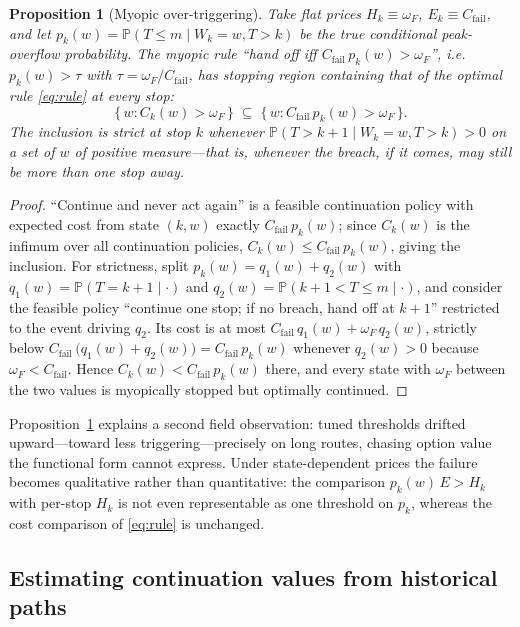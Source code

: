 \documentclass[preprint,authoryear,12pt]{elsarticle}
\newtheorem{proposition}[theorem]{Proposition}
\theoremstyle{definition}
\theoremstyle{remark}
\begin{document}
\begin{proposition}[Myopic over-triggering]\label{prop:myopic}
Take flat prices $H_k \equiv \omega_F$, $E_k \equiv C_{\mathrm{fail}}$,
and let $p_k(w) = \mathbb P(T \le m \mid W_k = w, T > k)$ be the true
conditional peak-overflow probability. The myopic rule ``hand off iff
$C_{\mathrm{fail}}\, p_k(w) > \omega_F$'', i.e.\ $p_k(w) > \tau$ with
$\tau = \omega_F / C_{\mathrm{fail}}$, has stopping region containing
that of the optimal rule \eqref{eq:rule} at every stop:
\[
  \{\, w : C_k(w) > \omega_F \,\} \;\subseteq\;
  \{\, w : C_{\mathrm{fail}}\, p_k(w) > \omega_F \,\} .
\]
The inclusion is strict at stop $k$ whenever
$\mathbb P(T > k+1 \mid W_k = w, T > k) > 0$ on a set of $w$ of positive
measure---that is, whenever the breach, if it comes, may still be more
than one stop away.
\end{proposition}

\begin{proof}
``Continue and never act again'' is a feasible continuation policy with
expected cost from state $(k,w)$ exactly $C_{\mathrm{fail}}\,p_k(w)$;
since $C_k(w)$ is the infimum over all continuation policies,
$C_k(w) \le C_{\mathrm{fail}}\, p_k(w)$, giving the inclusion. For
strictness, split $p_k(w) = q_1(w) + q_2(w)$ with
$q_1(w) = \mathbb P(T = k{+}1 \mid \cdot)$ and
$q_2(w) = \mathbb P(k{+}1 < T \le m \mid \cdot)$, and consider the
feasible policy ``continue one stop; if no breach, hand off at $k{+}1$''
restricted to the event driving $q_2$. Its cost is at most
$C_{\mathrm{fail}}\,q_1(w) + \omega_F\, q_2(w)$, strictly below
$C_{\mathrm{fail}}\,\bigl(q_1(w) + q_2(w)\bigr) =
C_{\mathrm{fail}}\,p_k(w)$ whenever $q_2(w) > 0$ because
$\omega_F < C_{\mathrm{fail}}$. Hence $C_k(w) <
C_{\mathrm{fail}}\,p_k(w)$ there, and every state with $\omega_F$
between the two values is myopically stopped but optimally continued.
\end{proof}

Proposition~\ref{prop:myopic} explains a second field observation:
tuned thresholds drifted upward---toward less triggering---precisely on
long routes, chasing option value the functional form cannot express.
Under state-dependent prices the failure becomes qualitative rather
than quantitative: the comparison $p_k(w)\,E > H_k$ with per-stop $H_k$
is not even representable as one threshold on $p_k$, whereas the cost
comparison of \eqref{eq:rule} is unchanged.

\subsection{Estimating continuation values from historical paths}
\label{sec:estimation}
\end{document}
